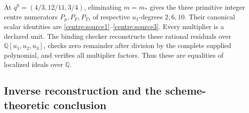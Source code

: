 \documentclass[11pt,a4paper]{article}
\theoremstyle{remark}\newtheorem{remark}[theorem]{Remark}
\begin{document}
At \(q^0=(4/3,12/11,3/4)\), eliminating \(m=m_*\) gives the three
primitive integer centre numerators \(P_p,P_F,P_T\), of respective
\(u_1\)-degrees \(2,6,10\). Their canonical scalar identities are
\eqref{centre:source1}--\eqref{centre:source3}. Every multiplier is a
declared unit. The binding checker reconstructs these rational residuals
over \(\mathbb Q[u_1,u_2,u_3]\), checks zero remainder after division by
the complete supplied polynomial, and verifies all multiplier factors.
Thus these are equalities of localized ideals over \(\mathbb Q\).

\subsection{Inverse reconstruction and the scheme-theoretic conclusion}
\end{document}
